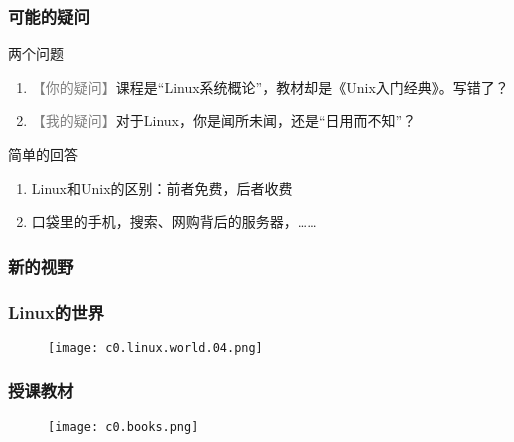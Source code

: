 \begin{frame}
  \frametitle{可能的疑问}
  \begin{block}{两个问题}
  \begin{enumerate}
    \item \textcolor{gray}{【你的疑问】}课程是“Linux系统概论”，教材却是《Unix入门经典》。写错了？
    \item \textcolor{gray}{【我的疑问】}对于Linux，你是闻所未闻，还是“日用而不知”？
  \end{enumerate}
\end{block}
  \pause
  \begin{block}{简单的回答}
  \begin{enumerate}
    \item Linux和Unix的区别：前者免费，后者收费
    \item 口袋里的手机，搜索、网购背后的服务器，……
  \end{enumerate}
\end{block}
\end{frame}

\begin{frame}
  \frametitle{新的视野}
  \begin{figure}
    \centering
    \quad
  \end{figure}
\end{frame}

\begin{frame}
  \frametitle{Linux的世界}
  \begin{figure}
    \centering
    \texttt{[image: c0.linux.world.04.png]}
  \end{figure}
\end{frame}

\begin{frame}
  \frametitle{授课教材}
  \begin{figure}
    \centering
    \texttt{[image: c0.books.png]}
  \end{figure}
\end{frame}

